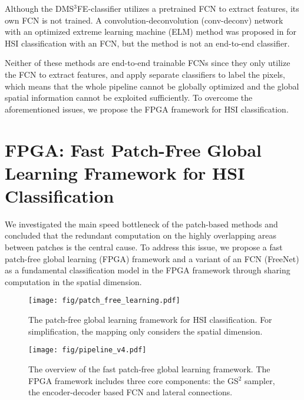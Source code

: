 \documentclass[journal]{IEEEtran}
\begin{document}
Although the DMS$^3$FE-classifier \cite{jiao2017deep} utilizes a pretrained FCN \cite{long2015fully} to extract features, its own FCN is not trained.
A convolution-deconvolution (conv-deconv) network with an optimized extreme learning machine (ELM) method was proposed in \cite{li2018classification} for HSI classification with an FCN, but the method is not an end-to-end classifier.

Neither of these methods are end-to-end trainable FCNs since they only utilize the FCN to extract features, and apply separate classifiers to label the pixels, which means that the whole pipeline cannot be globally optimized and the global spatial information cannot be exploited sufficiently.
To overcome the aforementioned issues, we propose the FPGA framework for HSI classification.


\section{FPGA: Fast Patch-Free Global Learning Framework for HSI Classification}
\label{sec:upl}
We investigated the main speed bottleneck of the patch-based methods and concluded that the redundant computation on the highly overlapping areas between patches is the central cause.
To address this issue, we propose a fast patch-free global learning (FPGA) framework and a variant of an FCN (FreeNet) as a fundamental classification model in the FPGA framework through sharing computation in the spatial dimension.

\begin{figure}[ht]
  \centering
  \texttt{[image: fig/patch\_free\_learning.pdf]}
  \caption{The patch-free global learning framework for HSI classification.
    For simplification, the mapping only considers the spatial dimension.}
  \label{fig:pfl}
\end{figure}

\begin{figure*}[ht]
  \centering
  \texttt{[image: fig/pipeline\_v4.pdf]}
  \caption{The overview of the fast patch-free global learning framework. The FPGA framework includes three core components: the GS$^2$ sampler, the encoder-decoder based FCN and lateral connections.}
  \label{fig:pipeline}
\end{figure*}
\end{document}
